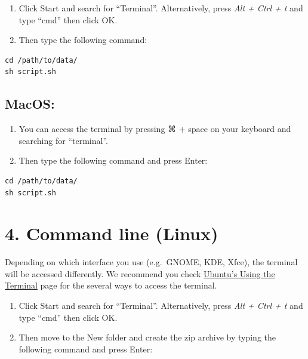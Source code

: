 \documentclass[
  a4paper,
  DIV=11,
  numbers=noendperiod,
  oneside,
  open=any]{scrreport}
\providecommand{\tightlist}{%
  \setlength{\itemsep}{0pt}\setlength{\parskip}{0pt}}\usepackage{longtable,booktabs,array}
\begin{document}
\begin{enumerate}
\def\labelenumi{\arabic{enumi}.}
\tightlist
\item
  Click Start and search for ``Terminal''. Alternatively, press
  \emph{Alt + Ctrl + t} and type ``cmd'' then click OK.
\item
  Then type the following command:
\end{enumerate}

\begin{verbatim}
cd /path/to/data/
sh script.sh
\end{verbatim}

\subsection{MacOS:}\label{macos}

\begin{enumerate}
\def\labelenumi{\arabic{enumi}.}
\tightlist
\item
  You can access the terminal by pressing ⌘ + space on your keyboard and
  searching for ``terminal''.
\item
  Then type the following command and press Enter:
\end{enumerate}

\begin{verbatim}
cd /path/to/data/
sh script.sh
\end{verbatim}

\section{4. Command line (Linux)}\label{command-line-linux}

Depending on which interface you use (e.g.~GNOME, KDE, Xfce), the
terminal will be accessed differently. We recommend you check
\href{https://help.ubuntu.com/community/UsingTheTerminal?action=show&redirect=BasicCommands}{Ubuntu's
Using the Terminal} page for the several ways to access the terminal.

\begin{enumerate}
\def\labelenumi{\arabic{enumi}.}
\tightlist
\item
  Click Start and search for ``Terminal''. Alternatively, press
  \emph{Alt + Ctrl + t} and type ``cmd'' then click OK.
\item
  Then move to the New folder and create the zip archive by typing the
  following command and press Enter:
\end{enumerate}
\end{document}
